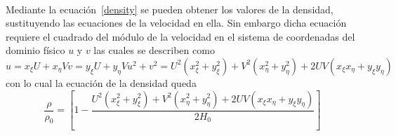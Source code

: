 \documentclass[letterpaper, openright, 12pt]{book}
\begin{document}
    \paragraph*{}
        Mediante la ecuación~\ref{density} se pueden obtener los valores de la
        densidad, sustituyendo las ecuaciones de la velocidad en ella. Sin
        embargo dicha ecuación requiere el cuadrado del módulo de la velocidad
        en el sistema de coordenadas del dominio físico $u$ y $v$ las cuales se
        describen como
        \begin{subequations}
            \begin{equation}
                u = x_\xi U + x_\eta V
            \end{equation}
            \begin{equation}
                v = y_\xi U + y_\eta V
            \end{equation}
            \begin{equation}
                u^2 + v^2 = U^2 \left( x_\xi^2 + y_\xi^2 \right)
                        + V^2 \left( x_\eta^2 + y_\eta^2 \right)
                        + 2UV \left( x_\xi x_\eta + y_\xi y_\eta \right)
            \end{equation}
        \end{subequations}
        con lo cual la ecuación de la densidad queda
        \begin{equation}
            \frac{\rho}{\rho_0} = \left[ 1 -
                \frac{U^2 \left( x_\xi^2 + y_\xi^2 \right)
                        + V^2 \left( x_\eta^2 + y_\eta^2 \right)
                        + 2UV \left( x_\xi x_\eta + y_\xi y_\eta \right)}
                    {2H_0}
            \right]
        \end{equation}
\end{document}
